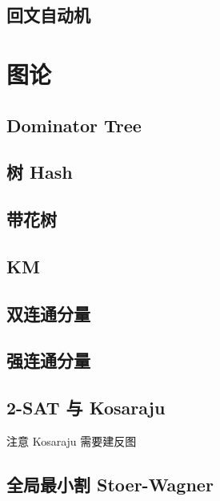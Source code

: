 \documentclass[landscape, twocolumn, 8pt, a4paper, twoside]{extarticle}
\begin{document}
\subsection{回文自动机}


\section{图论}
\subsection{Dominator Tree}


\subsection{树 Hash}


\subsection{带花树}


\subsection{KM}


\subsection{双连通分量}


\subsection{强连通分量}


\subsection{2-SAT 与 Kosaraju}
注意 Kosaraju 需要建反图


\subsection{全局最小割 Stoer-Wagner}

\end{document}
